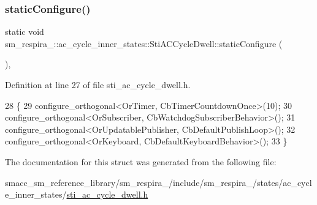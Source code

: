 \subsubsection{\texorpdfstring{static\+Configure()}{staticConfigure()}}
{\footnotesize\ttfamily static void sm\+\_\+respira\+\_\+::ac\+\_\+cycle\+\_\+inner\+\_\+states\+::\+Sti\+A\+C\+Cycle\+Dwell\+::static\+Configure (\begin{DoxyParamCaption}{ }\end{DoxyParamCaption})\hspace{0.3cm}{\ttfamily [inline]}, {\ttfamily [static]}}



Definition at line 27 of file sti\+\_\+ac\+\_\+cycle\+\_\+dwell.\+h.


\begin{DoxyCode}
28   \{
29     configure\_orthogonal<OrTimer, CbTimerCountdownOnce>(10);
30     configure\_orthogonal<OrSubscriber, CbWatchdogSubscriberBehavior>();
31     configure\_orthogonal<OrUpdatablePublisher, CbDefaultPublishLoop>();
32     configure\_orthogonal<OrKeyboard, CbDefaultKeyboardBehavior>();
33   \}
\end{DoxyCode}


The documentation for this struct was generated from the following file\+:\begin{DoxyCompactItemize}
\item 
smacc\+\_\+sm\+\_\+reference\+\_\+library/sm\+\_\+respira\+\_/include/sm\+\_\+respira\+\_/states/ac\+\_\+cycle\+\_\+inner\+\_\+states/\hyperlink{sti__ac__cycle__dwell_8h}{sti\+\_\+ac\+\_\+cycle\+\_\+dwell.\+h}\end{DoxyCompactItemize}
